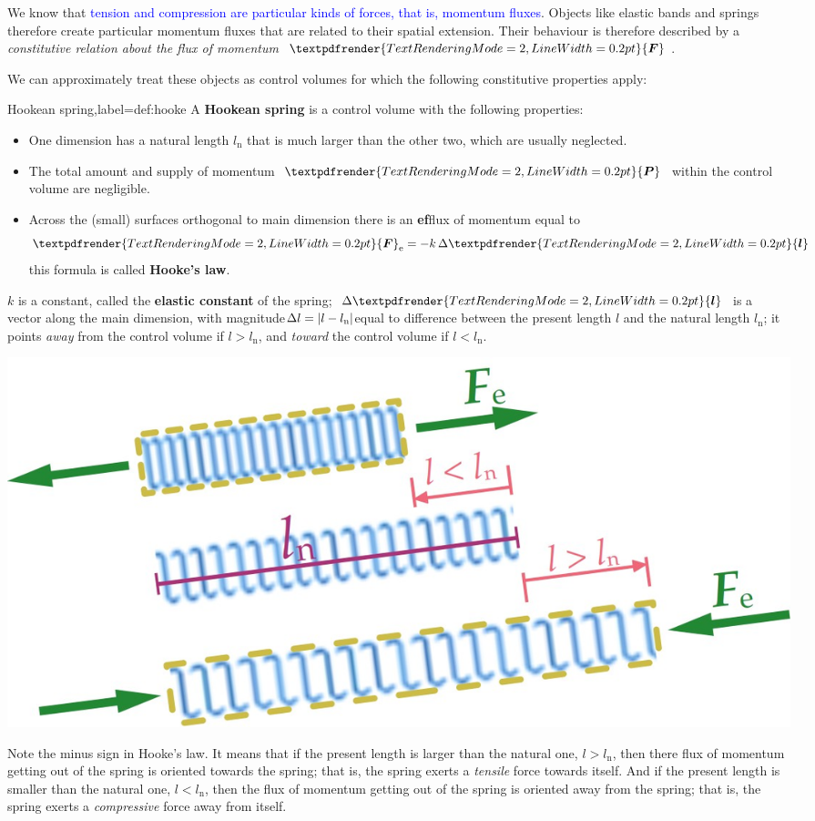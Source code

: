 \documentclass[a4paper,12pt,%
onecolumn,oneside,%
british%
]{memoir}
\renewcommand*{\bm}[1]{\textpdfrender{TextRenderingMode=2,LineWidth=0.2pt}{\boldsymbol{#1}}}
\newcommand*{\incr}{\Delta}%
\DeclarePairedDelimiter\abs{\lvert}{\rvert}
\renewcommand*{\|}[1][]{\nonscript\:#1\vert\nonscript\:\mathopen{}}
\newcommand*{\sect}{\S}%
\renewcommand*{\autoref}[2]{\sidepar{\vspace{-1ex}\footnotesize{\color{blue}\faIcon{%
angle-right%
}\enspace\sect~\ref{#1} page~\pageref{#1}}}\textcolor{blue}{#2}}
\newcommand*{\ylo}{l_{\textrm{n}}}
\newcommand*{\yle}{l}
\newcommand*{\ydl}{\incr\bm{l}}
\newcommand*{\ydlm}{\incr l}
\newcommand*{\yP}{\bm{P}}
\newcommand*{\yF}{\bm{F}}
\begin{document}
We know that \autoref{sec:pressure_tension_shear}{tension and compression are particular kinds of forces, that is, momentum fluxes}. Objects like elastic bands and springs therefore create particular momentum fluxes that are related to their spatial extension. Their behaviour is therefore described by a \emph{constitutive relation about the flux of momentum $\yF$}.

We can approximately treat these objects as control volumes for which the following constitutive properties apply:
\begin{definition}{Hookean spring,label={def:hooke}}
  A \textbf{Hookean spring} is a control volume with the following properties:
  \begin{itemize}
  \item One dimension has a natural length $\ylo$ that is much larger than the other two, which are usually neglected.
  \item The total amount and supply of momentum $\yP$ within the control volume are negligible.
  \item Across the (small) surfaces orthogonal to main dimension there is an \textbf{ef}flux of momentum equal to
    \begin{equation}
      \label{eq:hooke}
      \yF_{\textrm{e}} = -k\,\ydl
    \end{equation}
    this formula is called \textbf{Hooke's law}.
  \end{itemize}
  $k$ is a constant, called the \textbf{elastic constant} of the spring; $\ydl$ is a vector along the main dimension, with magnitude\enspace$\ydlm = \abs{\yle-\ylo}$\enspace equal to difference between the present length $\yle$ and the natural length $\ylo$; it points \emph{away} from the control volume if $\yle>\ylo$, and \emph{toward} the control volume if $\yle<\ylo$.
  \begin{center}
\includegraphics[width=0.67\linewidth]{images/hooke3.jpg}%
  \end{center}
\end{definition}
%
Note the minus sign in Hooke's law. It means that if the present length is larger than the natural one, $\yle > \ylo$, then there flux of momentum getting out of the spring is oriented towards the spring; that is, the spring exerts a \emph{tensile} force towards itself. And if the present length is smaller than the natural one, $\yle < \ylo$, then the flux of momentum getting out of the spring is oriented away from the spring; that is, the spring exerts a \emph{compressive} force away from itself.
\end{document}
